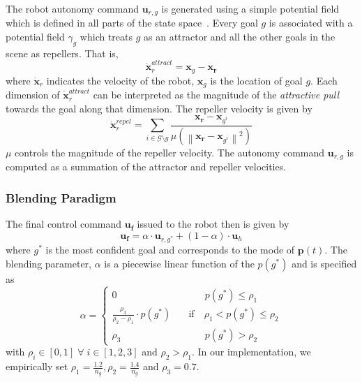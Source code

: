 \documentclass[conference]{IEEEtran}
\newcommand{\norm}[1]{\left\lVert#1\right\rVert}
\begin{document}
The robot autonomy command $\boldsymbol{u}_{r,g}$ is generated using a simple potential field which is defined in all parts of the state space~\citep{khatib1986real}. Every goal $g$ is associated with a potential field $\gamma_g$ which treats $g$ as an attractor and all the other goals in the scene as repellers. That is,
\begin{equation*}
\dot{\boldsymbol{x}}_r^{attract} = \boldsymbol{x}_{g} - \boldsymbol{x_r}
\end{equation*}
 where $\dot{\boldsymbol{x}}_r$ indicates the velocity of the robot, $\boldsymbol{x}_{g}$ is the location of goal $g$. Each dimension of $\dot{\boldsymbol{x}}_r^{attract}$ can be interpreted as the magnitude of the \textit{attractive pull} towards the goal along that dimension. 
The repeller velocity is given by
\begin{equation*}
\dot{\boldsymbol{x}}_r^{repel} = \sum_{i \in \mathcal{G} \setminus g} \frac{\boldsymbol{x_r} - \boldsymbol{x}_{g^i}}{\mu(\norm{\boldsymbol{x_r} - \boldsymbol{x}_{g^i}}^2)}
\end{equation*}
 $\mu$ controls the magnitude of the repeller velocity. The autonomy command $\boldsymbol{u}_{r,g}$ is computed as a summation of the attractor and repeller velocities.
\subsubsection{Blending Paradigm}\label{sssec:blending}
The final control command $\boldsymbol{u_f}$ issued to the robot then is given by
\begin{equation*}
\boldsymbol{u_f} = \alpha\cdot \boldsymbol{u}_{r,g^*} + (1 - \alpha)\cdot \boldsymbol{u}_h
\end{equation*}
where $g^*$ is the most confident goal and corresponds to the mode of $\boldsymbol{p}(t)$. The blending parameter, $\alpha$ is a piecewise linear function of the $p(g^*)$ and is specified as
$$
\alpha = \left\{
\begin{array}{ll}
0 & \quad\quad~~~ p(g^*) \leq \rho_1 \\
\frac{\rho_3}{\rho_2 - \rho_1}\cdot p(g^*) &  \quad \text{if}\quad \rho_1 < p(g^*) \leq \rho_2  \\
\rho_3 & \quad\quad~~~ p(g^*) > \rho_2 	
\end{array}
\right.
$$
with $\rho_i \in [0, 1] \;\forall\; i \in [1,2,3]$ and $ \rho_2 > \rho_1$. 
In our implementation, we empirically set $\rho_1 = \frac{1.2}{n_g}, \rho_2 = \frac{1.4}{n_g}$ and $ \rho_3 = 0.7$.
\end{document}
